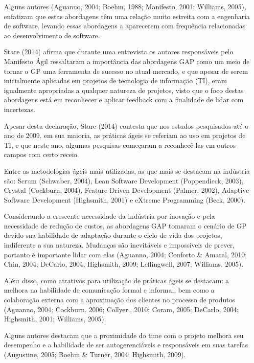 Alguns autores (Aguanno, 2004; Boehm, 1988; Manifesto, 2001; Williams, 2005), enfatizam que estas abordagens têm uma relação muito estreita com a engenharia de software, levando essas abordagens a aparecerem com frequência relacionadas ao desenvolvimento de software.

Stare (2014) afirma que durante uma entrevista os autores responsáveis pelo Manifesto Ágil ressaltaram a importância das abordagens GAP como um meio de tornar o GP uma ferramenta de sucesso no atual mercado, e que apesar de serem inicialmente aplicadas em projetos de tecnologia de informação (TI), eram igualmente apropriadas a qualquer natureza de projetos, visto que o foco destas abordagens está em reconhecer e aplicar feedback com a finalidade de lidar com incertezas.

Apesar desta declaração, Stare (2014) contesta que nos estudos pesquisados até o ano de 2009, em sua maioria, as práticas ágeis se referiam ao uso em projetos de TI, e que neste ano, algumas pesquisas começaram a reconhecê-las em outros campos com certo receio.

Entre as metodologias ágeis mais utilizadas, as que mais se destacam na indústria são: Scrum (Schwaber, 2004), Lean Software Development (Poppendieck, 2003), Crystal (Cockburn, 2004), Feature Driven Development (Palmer, 2002), Adaptive Software Development (Highsmith, 2001) e eXtreme Programming (Beck, 2000).

Considerando a crescente necessidade da indústria por inovação e pela necessidade de redução de custos, as abordagens GAP tomaram o cenário de GP devido sua habilidade de adaptação durante o ciclo de vida dos projetos, indiferente a sua natureza. Mudanças são inevitáveis e impossíveis de prever, portanto é importante lidar com elas (Aguanno, 2004; Conforto \& Amaral, 2010; Chin, 2004; DeCarlo, 2004; Highsmith, 2009; Leffingwell, 2007; Williams, 2005).

Além disso, como atrativos para utilização de práticas ágeis se destacam: a melhora na habilidade de comunicação formal e informal, bem como a colaboração externa com a aproximação dos clientes no processo de produtos (Aguanno, 2004; Cockburn, 2006; Collyer., 2010; Coram, 2005; DeCarlo, 2004; Highsmith, 2001; Williams, 2005).

Alguns autores destacam que a proximidade do time com o projeto melhora seu desempenho e a habilidade de ser autogerenciáveis e responsáveis em suas tarefas (Augustine, 2005; Boehm \& Turner, 2004; Highsmith, 2009).

